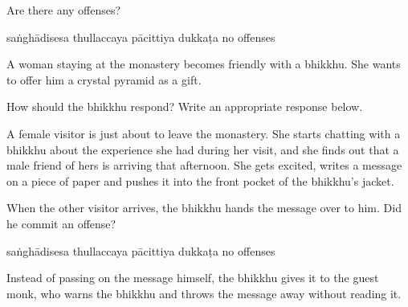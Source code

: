 \begin{exam}{\autoExamName}
\begin{problem}
  Are there any offenses?

  \bigskip

  \begin{answers}{5}
    \bChoices
     saṅghādisesa\eAns
     thullaccaya\eAns
     pācittiya\eAns
     dukkaṭa\eAns
     no offenses\eAns
    \eChoices
  \end{answers}

\end{problem}

\problemDivide

\begin{problem}

  A woman staying at the monastery becomes friendly with a bhikkhu.
  She wants to offer him a crystal pyramid as a gift.

  How should the bhikkhu respond? Write an appropriate response below.

  \bigskip


\end{problem}

\problemDivide

\begin{problem*}

  A female visitor is just about to leave the monastery.
  She starts chatting with a bhikkhu about the experience she had during her visit,
  and she finds out that a male friend of hers is arriving that afternoon.
  She gets excited, writes a message on a piece of paper and pushes it into the front pocket of the bhikkhu's jacket.

  \begin{parts}

    \bigskip

    \item When the other visitor arrives, the bhikkhu hands the message over to him. Did he commit an offense?

    \bigskip

    \begin{answers}{5}
      \bChoices
       saṅghādisesa\eAns
       thullaccaya\eAns
       pācittiya\eAns
       dukkaṭa\eAns
       no offenses\eAns
      \eChoices
    \end{answers}

    \ifnosolutions
    \bigskip
    \else
    \clearpage
    \fi

    \item Instead of passing on the message himself, the bhikkhu gives it to the
    guest monk, who warns the bhikkhu and throws the message away without
    reading it.


\end{parts}
\end{problem*}
\end{exam}

